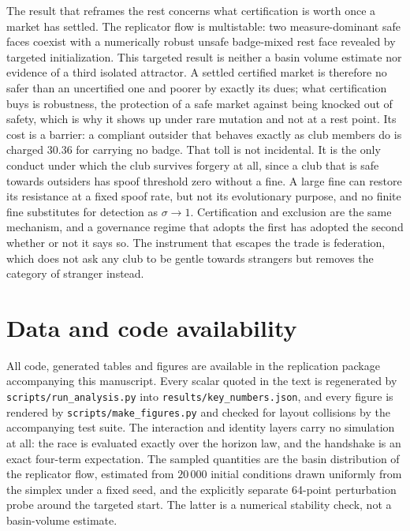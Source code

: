 \documentclass[11pt,a4paper]{article}
\theoremstyle{definition}
\begin{document}
The result that reframes the rest concerns what certification is worth once a
market has settled. The replicator flow is multistable: two measure-dominant
safe faces coexist with a numerically robust unsafe badge-mixed rest face
revealed by targeted initialization. This targeted result is neither a basin
volume estimate nor evidence of a third isolated attractor. A
settled certified market is therefore no safer than an uncertified one and
poorer by exactly its dues; what certification buys is robustness, the
protection of a safe market against being knocked out of safety, which is why
it shows up under rare mutation and not at a rest point. Its cost is a
barrier: a compliant outsider that behaves exactly as club members do is
charged $30.36$ for carrying no badge. That toll is not incidental. It is the
only conduct under which the club survives forgery at all, since a club that
is safe towards outsiders has spoof threshold zero without a fine. A large
fine can restore its resistance at a fixed spoof rate, but not its evolutionary
purpose, and no finite fine substitutes for detection as $\sigma\to1$.
Certification and exclusion are the same mechanism, and a governance regime
that adopts the first has adopted the second whether or not it says so. The
instrument that escapes the trade is federation, which does not ask any club
to be gentle towards strangers but removes the category of stranger instead.

\section*{Data and code availability}

All code, generated tables and figures are available in the replication package
accompanying this manuscript. Every scalar quoted in the text is regenerated by
\texttt{scripts/run\_analysis.py} into \texttt{results/key\_numbers.json}, and
every figure is rendered by \texttt{scripts/make\_figures.py} and checked for
layout collisions by the accompanying test suite. The interaction and identity
layers carry no simulation at all: the race is evaluated exactly over the
horizon law, and the handshake is an exact four-term expectation. The sampled
quantities are the basin distribution of the replicator flow, estimated from
$20\,000$ initial conditions drawn uniformly from the simplex under a fixed
seed, and the explicitly separate 64-point perturbation probe around the
targeted start. The latter is a numerical stability check, not a basin-volume
estimate.
\end{document}
